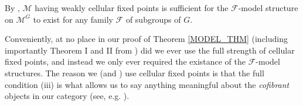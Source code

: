\documentclass[a4paper,10pt
,draft
]{article}%
\renewcommand{\F}{\mathcal F}
\renewcommand{\1}{\eta}%
\begin{document}
\begin{remark}
      By \cite[Rem. 2.8]{Ste16}, $\mathcal M$ having weakly cellular fixed points is sufficient for the 
      $\F$-model structure on $\mathcal M^G$ to exist for any family $\F$ of subgroups of $G$.
\end{remark}

\begin{remark}
      \label{WEAKCELL_REM}
      Conveniently, at no place in our proof of Theorem \ref{MODEL_THM} (including importantly Theorem I and II from \cite{BP_geo})
      did we ever use the full strength of cellular fixed points,
      and instead we only ever required the existance of the $\F$-model structures.
      The reason we (and \cite{Ste16}) use cellular fixed points is that the full condition (iii) is what allows us to say anything meaningful about the \textit{cofibrant} objects in our category (see, e.g. \cite[Prop. 6.56 and Lemma 6.59]{BP_geo}).
\end{remark}
\end{document}
